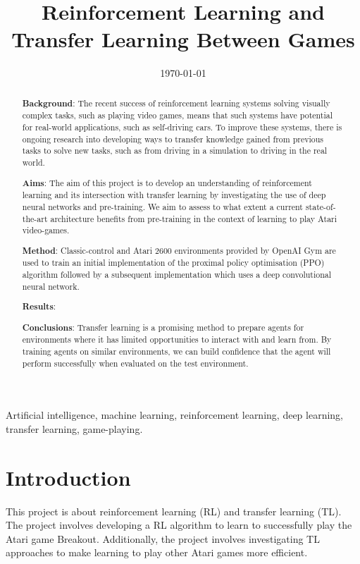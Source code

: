 \documentclass[12pt,a4paper]{article}
\title{Reinforcement Learning and \\ Transfer Learning Between Games}
\author{} %
\date{\today}
\begin{document}
\maketitle

\begin{abstract}
{\bf Background}: The recent success of reinforcement learning systems solving visually complex tasks, such as playing video games, means that such systems have potential for real-world applications, such as self-driving cars. To improve these systems, there is ongoing research into developing ways to transfer knowledge gained from previous tasks to solve new tasks, such as from driving in a simulation to driving in the real world.

{\bf Aims}: The aim of this project is to develop an understanding of reinforcement learning and its intersection with transfer learning by investigating the use of deep neural networks and pre-training. We aim to assess to what extent a current state-of-the-art architecture benefits from pre-training in the context of learning to play Atari video-games.

{\bf Method}: Classic-control and Atari 2600 environments provided by OpenAI Gym are used to train an initial implementation of the proximal policy optimisation (PPO) algorithm followed by a subsequent implementation which uses a deep convolutional neural network.

{\bf Results}: 

{\bf Conclusions}: Transfer learning is a promising method to prepare agents for environments where it has limited opportunities to interact with and learn from. By training agents on similar environments, we can build confidence that the agent will perform successfully when evaluated on the test environment.
\end{abstract}

\begin{keywords}
Artificial intelligence, machine learning, reinforcement learning, deep learning, transfer learning, game-playing.
\end{keywords}

\section{Introduction}
This project is about reinforcement learning (RL) and transfer learning (TL). The project involves developing a RL algorithm to learn to successfully play the Atari game Breakout. Additionally, the project involves investigating TL approaches to make learning to play other Atari games more efficient. 
\end{document}
